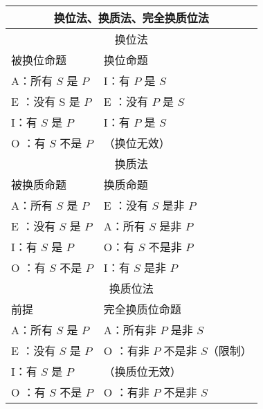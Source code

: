 \begin{center}
\begin{tabular}{|l|l|}
\hline
\multicolumn{2}{|c|}{换位法、换质法、完全换质位法} \\
\hline
\multicolumn{2}{|c|}{换位法} \\
\hline
被换位命题 & 换位命题 \\
\hline
A：所有 $S$ 是 $P$ & I：有 $P$ 是 $S$ \\
\hline
E ：没有 S 是 $P$ & E ：没有 $P$ 是 $S$ \\
\hline
I：有 $S$ 是 $P$ & I：有 $P$ 是 $S$ \\
\hline
O ：有 $S$ 不是 $P$ & （换位无效） \\
\hline
\multicolumn{2}{|c|}{换质法} \\
\hline
被换质命题 & 换质命题 \\
\hline
A：所有 $S$ 是 $P$ & E ：没有 $S$ 是非 $P$ \\
\hline
E ：没有 $S$ 是 $P$ & A：所有 $S$ 是非 $P$ \\
\hline
I：有 $S$ 是 $P$ & O：有 $S$ 不是非 $P$ \\
\hline
O ：有 $S$ 不是 $P$ & I：有 $S$ 是非 $P$ \\
\hline
\multicolumn{2}{|c|}{换质位法} \\
\hline
前提 & 完全换质位命题 \\
\hline
A：所有 $S$ 是 $P$ & A：所有非 $P$ 是非 $S$ \\
\hline
E ：没有 $S$ 是 $P$ & O ：有非 $P$ 不是非 $S$（限制） \\
\hline
I：有 $S$ 是 $P$ & （换质位无效） \\
\hline
O ：有 $S$ 不是 $P$ & O ：有非 $P$ 不是非 $S$ \\
\hline
\end{tabular}
\end{center}


